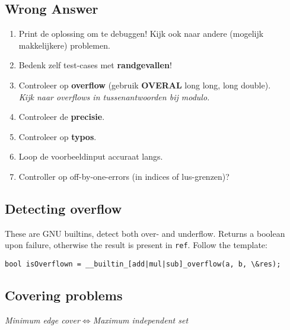 \documentclass[8pt,a4paper,landscape,oneside]{amsart}
\begin{document}
\begin{multicols*}{3}
\subsection{Wrong Answer}

\begin{enumerate}
	\setlength\itemsep{-.25em}
	\item Print de oplossing om te debuggen! Kijk ook naar andere (mogelijk makkelijkere) problemen.
	\item Bedenk zelf test-cases met \textbf{randgevallen}!
	\item Controleer op \textbf{overflow} (gebruik \textbf{OVERAL} long long, long double).
		\\ \textit{Kijk naar overflows in tussenantwoorden bij modulo.}
	\item Controleer de \textbf{precisie}.
	\item Controleer op \textbf{typo\textquotesingle s}.
	\item Loop de voorbeeldinput accuraat langs.
	\item Controller op off-by-one-errors (in indices of lus-grenzen)?
\end{enumerate}

\subsection{Detecting overflow}
These are GNU builtins, detect both over- and underflow. Returns a boolean upon failure, otherwise the result is present in \texttt{ref}. Follow the template:

\begin{lstlisting}
bool isOverflown = __builtin_[add|mul|sub]_overflow(a, b, \&res);
\end{lstlisting}

\subsection{Covering problems}

\begin{center}
	\emph{Minimum edge cover$\iff$Maximum independent set}
\end{center}


\end{multicols*}
\end{document}

